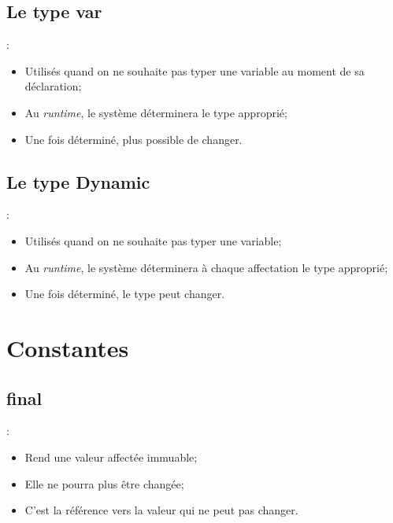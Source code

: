 \documentclass[10pt]{beamer}
\begin{document}
\subsection{Le type var}
\begin{frame}[fragile,t]{\secname : \subsecname}
    \begin{itemize}
        \item Utilisés quand on ne souhaite pas typer une variable au moment de sa déclaration;
        \item Au \textit{runtime}, le système déterminera le type approprié;
        \item Une fois déterminé, plus possible de changer.
    \end{itemize}
    
\end{frame}

\subsection{Le type Dynamic}
\begin{frame}[fragile,t]{\secname : \subsecname}
    \begin{itemize}
        \item Utilisés quand on ne souhaite pas typer une variable;
        \item Au \textit{runtime}, le système déterminera à chaque affectation le type approprié;
        \item Une fois déterminé, le type peut changer.
    \end{itemize}
    
\end{frame}

\section{Constantes}
\subsection{final}
\begin{frame}[fragile,t]{\secname : \subsecname}
    \begin{itemize}
        \item Rend une valeur affectée immuable;
        \item Elle ne pourra plus être changée;
        \item C'est la référence vers la valeur qui ne peut pas changer.
    \end{itemize}
    
\end{frame}
\end{document}
